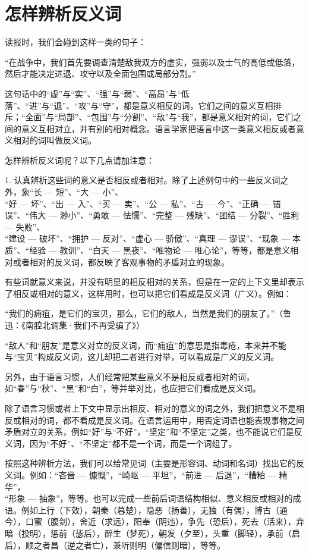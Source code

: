 \section{怎样辨析反义词}

读报时，我们会碰到这样一类的句子：

“在战争中，我们首先要调查清楚敌我双方的虚实，强弱以及士气的高低或低落，然后才能决定进退、攻守以及全面包围或局部分割。”

这句话中的“虚”与“实”、“强”与“弱”、“高昂”与“低落”、“进”与“退”、“攻”与“守”，都是意义相反的词，它们之间的意义互相排斥；“全面”与“局部”、“包围”与“分割”、“敌”与“我”，都是意义相对的词，它们之间的意义互相对立，并有别的相对概念。语言学家把语言中这一类意义相反或者意义相对的词叫做反义词。

怎样辨析反义词呢？以下几点请加注意：

1. 认真辨析这些词的意义是否相反或者相对。除了上述例句中的一些反义词之外，象“长 --- 短”、“大 --- 小”、\\
“好 --- 坏”、“出 --- 入”、“买 --- 卖”、“公 --- 私”、“古 --- 今”、“正确 --- 错误”、“伟大 --- 渺小”、“勇敢 --- 怯懦”、“完整 --- 残缺”、“团结 --- 分裂”、“胜利 --- 失败”、\\
“建设 --- 破坏”、“拥护 --- 反对”、“虚心 --- 骄傲”、“真理 --- 谬误”、“现象 --- 本质”、“经验 --- 教训”、“白天 --- 黑夜”、“唯物论 --- 唯心论”，等等，都是意义相对或者相对的反义词，都反映了客观事物的矛盾对立的现象。

有些词就意义来说，并没有明显的相反相对的关系，但是在一定的上下文里却表示了相反或相对的意义，这样用时，也可以把它们看成是反义词（广义）。例如：

“我们的痈疽，是它们的宝贝，那么，它们的敌人，当然是我们的朋友了。”（鲁迅：《南腔北调集·我们不再受骗了》）

“敌人”和“朋友”是意义对立的反义词，而“痈疽”的意思是指毒疮，本来并不能与“宝贝”构成反义词，这儿却把二者进行对举，可以看成是广义的反义词。

另外，由于语言习惯，人们经常把某些意义不是相反或者相对的词，如“春”与“秋”、“黑”和“白”，等并举对比，也应把它们看成是反义词。

除了语言习惯或者上下文中显示出相反、相对的意义的词之外，我们把意义不是相反或相对的词，都不看成是反义词。在语言运用中，用否定词语也能表现事物之间矛盾对立的关系，例如“好”与“不好”，“坚定”和“不坚定”之类，也不能说它们是反义词，因为“不好”、“不坚定”都不是一个词，而是一个词组了。

按照这种辨析方法，我们可以给常见词（主要是形容词、动词和名词）找出它的反义词。例如：“吝啬 --- 慷慨”，“崎岖 --- 平坦”，“前进 --- 后退”，“糟粕 --- 精华”，\\
“形象 --- 抽象”，等等。也可以完成一些前后词语结构相似、意义相反或相对的成语。例如上行（下效），朝秦（暮楚），隐恶（扬善），无独（有偶），博古（通今），口蜜（腹剑），舍近（求远），阳奉（阴违），争先（恐后），死去（活来），弃暗（投明），惩前（毖后），醉生（梦死），朝发（夕至），头重（脚轻），承前（启后），顺之者昌（逆之者亡），兼听则明（偏信则暗），等等。

